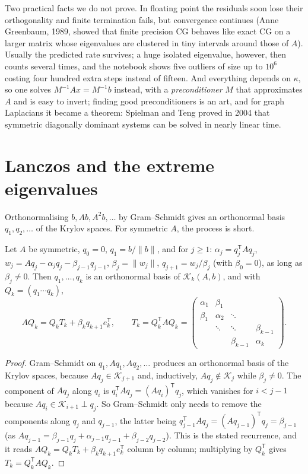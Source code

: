 \begin{remark}
Two practical facts we do not prove. In floating point the residuals soon lose their orthogonality and finite termination fails, but convergence
continues (Anne Greenbaum, 1989, showed that finite precision CG behaves like exact CG on a larger matrix whose eigenvalues are clustered in tiny intervals
around those of $A$). Usually the predicted rate survives; a huge isolated eigenvalue, however, then counts several times, and the notebook shows five outliers
of size up to $10^6$ costing four hundred extra steps instead of fifteen. And everything depends on $\kappa$, so one solves $M^{-1}Ax=M^{-1}b$ instead, with a \emph{preconditioner} $M$
that approximates $A$ and is easy to invert; finding good preconditioners is an art, and for graph Laplacians it became a theorem: Spielman and Teng
proved in 2004 that symmetric diagonally dominant systems can be solved in nearly linear time.
\end{remark}

\section{Lanczos and the extreme eigenvalues}\label{sec:lanczos}

Orthonormalising $b,Ab,A^2b,\dots$ by Gram--Schmidt gives an orthonormal basis $q_1,q_2,\dots$ of the Krylov spaces. For symmetric $A$, the process is
short.

\begin{proposition}[Lanczos, 1950]\label{prop:lanczos}
Let $A$ be symmetric, $q_0=0$, $q_1=b/\|b\|$, and for $j\ge1$: $\alpha_j=q_j^{\mathsf T}Aq_j$, $w_j=Aq_j-\alpha_jq_j-\beta_{j-1}q_{j-1}$, $\beta_j=\|w_j\|$,
$q_{j+1}=w_j/\beta_j$ (with $\beta_0=0$), as long as $\beta_j\ne0$. Then $q_1,\dots,q_k$ is an orthonormal basis of $\mathcal K_k(A,b)$, and with $Q_k=(q_1\cdots q_k)$,
\[
AQ_k=Q_kT_k+\beta_kq_{k+1}e_k^{\mathsf T},\qquad T_k=Q_k^{\mathsf T}AQ_k=\begin{pmatrix}\alpha_1&\beta_1\\\beta_1&\alpha_2&\ddots\\&\ddots&\ddots&\beta_{k-1}\\&&\beta_{k-1}&\alpha_k\end{pmatrix}.
\]
\end{proposition}
\begin{proof}
Gram--Schmidt on $q_1,Aq_1,Aq_2,\dots$ produces an orthonormal basis of the Krylov spaces, because $Aq_j\in\mathcal K_{j+1}$ and, inductively, $Aq_j\notin\mathcal K_j$ while
$\beta_j\ne0$. The component of $Aq_j$ along $q_i$ is $q_i^{\mathsf T}Aq_j=(Aq_i)^{\mathsf T}q_j$, which vanishes for $i<j-1$ because $Aq_i\in\mathcal K_{i+1}\perp q_j$. So Gram--Schmidt only
needs to remove the components along $q_j$ and $q_{j-1}$, the latter being $q_{j-1}^{\mathsf T}Aq_j=(Aq_{j-1})^{\mathsf T}q_j=\beta_{j-1}$ (as
$Aq_{j-1}=\beta_{j-1}q_j+\alpha_{j-1}q_{j-1}+\beta_{j-2}q_{j-2}$). This is the stated recurrence, and it reads $AQ_k=Q_kT_k+\beta_kq_{k+1}e_k^{\mathsf T}$ column by column;
multiplying by $Q_k^{\mathsf T}$ gives $T_k=Q_k^{\mathsf T}AQ_k$.
\end{proof}

